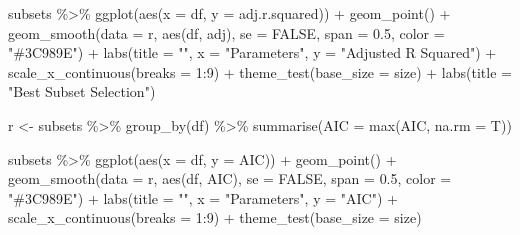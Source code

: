 \documentclass[
  english,
  man,floatsintext]{apa6}
\newenvironment{Shaded}{\begin{snugshade}}{\end{snugshade}}
\newcommand{\AttributeTok}[1]{\textcolor[rgb]{0.77,0.63,0.00}{#1}}
\newcommand{\ConstantTok}[1]{\textcolor[rgb]{0.00,0.00,0.00}{#1}}
\newcommand{\DecValTok}[1]{\textcolor[rgb]{0.00,0.00,0.81}{#1}}
\newcommand{\FloatTok}[1]{\textcolor[rgb]{0.00,0.00,0.81}{#1}}
\newcommand{\FunctionTok}[1]{\textcolor[rgb]{0.00,0.00,0.00}{#1}}
\newcommand{\NormalTok}[1]{#1}
\newcommand{\OtherTok}[1]{\textcolor[rgb]{0.56,0.35,0.01}{#1}}
\newcommand{\SpecialCharTok}[1]{\textcolor[rgb]{0.00,0.00,0.00}{#1}}
\newcommand{\StringTok}[1]{\textcolor[rgb]{0.31,0.60,0.02}{#1}}
\begin{document}
\begin{Shaded}
\begin{Highlighting}[]
\NormalTok{subsets }\SpecialCharTok{\%\textgreater{}\%} 
  \FunctionTok{ggplot}\NormalTok{(}\FunctionTok{aes}\NormalTok{(}\AttributeTok{x =}\NormalTok{ df, }\AttributeTok{y =}\NormalTok{ adj.r.squared)) }\SpecialCharTok{+} 
  \FunctionTok{geom\_point}\NormalTok{() }\SpecialCharTok{+} 
  \FunctionTok{geom\_smooth}\NormalTok{(}\AttributeTok{data =}\NormalTok{ r, }\FunctionTok{aes}\NormalTok{(df, adj), }
              \AttributeTok{se =} \ConstantTok{FALSE}\NormalTok{, }\AttributeTok{span =} \FloatTok{0.5}\NormalTok{, }\AttributeTok{color =} \StringTok{"\#3C989E"}\NormalTok{) }\SpecialCharTok{+} 
  \FunctionTok{labs}\NormalTok{(}\AttributeTok{title =} \StringTok{""}\NormalTok{, }\AttributeTok{x =} \StringTok{"Parameters"}\NormalTok{, }\AttributeTok{y =} \StringTok{"Adjusted R Squared"}\NormalTok{) }\SpecialCharTok{+} 
  \FunctionTok{scale\_x\_continuous}\NormalTok{(}\AttributeTok{breaks =} \DecValTok{1}\SpecialCharTok{:}\DecValTok{9}\NormalTok{) }\SpecialCharTok{+} 
  \FunctionTok{theme\_test}\NormalTok{(}\AttributeTok{base\_size =}\NormalTok{ size) }\SpecialCharTok{+} \FunctionTok{labs}\NormalTok{(}\AttributeTok{title =} \StringTok{"Best Subset Selection"}\NormalTok{)}

\NormalTok{r }\OtherTok{\textless{}{-}}\NormalTok{ subsets }\SpecialCharTok{\%\textgreater{}\%} 
  \FunctionTok{group\_by}\NormalTok{(df) }\SpecialCharTok{\%\textgreater{}\%} 
  \FunctionTok{summarise}\NormalTok{(}\AttributeTok{AIC =} \FunctionTok{max}\NormalTok{(AIC, }\AttributeTok{na.rm =}\NormalTok{ T))}

\NormalTok{subsets }\SpecialCharTok{\%\textgreater{}\%} 
  \FunctionTok{ggplot}\NormalTok{(}\FunctionTok{aes}\NormalTok{(}\AttributeTok{x =}\NormalTok{ df, }\AttributeTok{y =}\NormalTok{ AIC)) }\SpecialCharTok{+} 
  \FunctionTok{geom\_point}\NormalTok{() }\SpecialCharTok{+} 
  \FunctionTok{geom\_smooth}\NormalTok{(}\AttributeTok{data =}\NormalTok{ r, }\FunctionTok{aes}\NormalTok{(df, AIC), }
              \AttributeTok{se =} \ConstantTok{FALSE}\NormalTok{, }\AttributeTok{span =} \FloatTok{0.5}\NormalTok{, }\AttributeTok{color =} \StringTok{"\#3C989E"}\NormalTok{) }\SpecialCharTok{+} 
  \FunctionTok{labs}\NormalTok{(}\AttributeTok{title =} \StringTok{""}\NormalTok{, }\AttributeTok{x =} \StringTok{"Parameters"}\NormalTok{, }\AttributeTok{y =} \StringTok{"AIC"}\NormalTok{) }\SpecialCharTok{+} 
  \FunctionTok{scale\_x\_continuous}\NormalTok{(}\AttributeTok{breaks =} \DecValTok{1}\SpecialCharTok{:}\DecValTok{9}\NormalTok{) }\SpecialCharTok{+} 
  \FunctionTok{theme\_test}\NormalTok{(}\AttributeTok{base\_size =}\NormalTok{ size) }


\end{Highlighting}
\end{Shaded}
\end{document}
